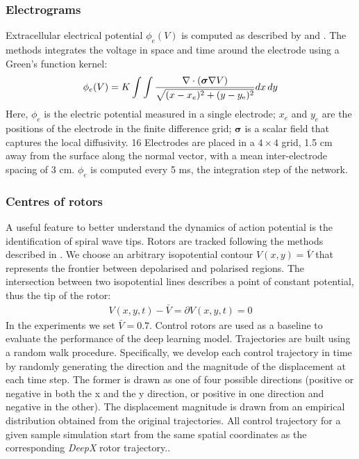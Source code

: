 \documentclass[utf8]{frontiersSCNS} %
\begin{document}
\subsubsection{Electrograms}
\label{sec:methods:evaluation:electrograms}
Extracellular electrical potential $\phi_{e}(V)$ is computed as described by \cite{spach1979extracellular} and \cite{varela2014role}. The methods integrates the voltage in space and time around the electrode using a Green's function kernel:
\begin{align}
\phi_{e}(V) = K \int\int{ \frac{\nabla \cdot (\boldsymbol{\sigma}\nabla V)}{\sqrt{(x-x_{e})^{2}+(y-y_{{\rm e}})^{2}}}} dx\,dy
\end{align}
Here, $\phi_{e}$ is the electric potential measured in a single electrode; $x_e$ and $y_e$ are the positions of the electrode in the finite difference grid; $\boldsymbol{\sigma}$ is a scalar field that captures the local diffusivity.
16 Electrodes are placed in a $4 \times 4$ grid, 1.5 cm away from the surface along the normal vector, with a mean inter-electrode spacing of 3 cm. $\phi_{e}$ is computed every 5 ms, the integration step of the network.

\subsubsection{Centres of rotors}
\label{sec:methods:evaluation:rotors}
A useful feature to better understand the dynamics of action potential is the identification of spiral wave tips. Rotors are tracked following the methods described in \cite{Fenton1998}. We choose an arbitrary isopotential contour $V(x, y) = \bar{V}$ that represents the frontier between depolarised and polarised regions. The intersection between two isopotential lines describes a point of constant potential, thus the tip of the rotor:
\begin{align}
    V(x, y, t) - \bar{V} = \partial V(x, y, t) = 0
\end{align}
In the experiments we set $\bar{V} = 0.7$.
Control rotors are used as a baseline to evaluate the performance of the deep learning model. Trajectories are built using a random walk procedure.
Specifically, we develop each control trajectory in time by randomly generating the direction and the magnitude of the displacement at each time step. The former is drawn as one of four possible directions (positive or negative in both the x and the y direction, or positive in one direction and negative in the other). The displacement magnitude is drawn from an empirical distribution obtained from the original trajectories. All control trajectory for a given sample simulation start from the same spatial coordinates as the corresponding \textit{DeepX} rotor trajectory..
\end{document}
